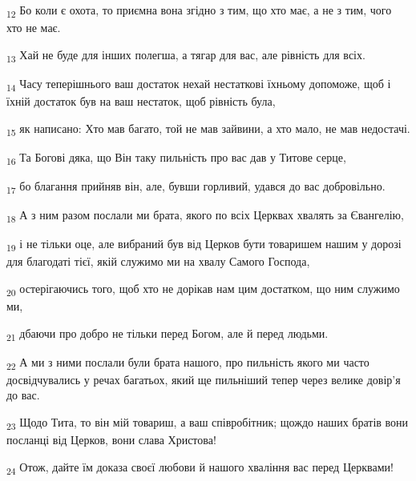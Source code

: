 \begin{tcolorbox}
\textsubscript{12} Бо коли є охота, то приємна вона згідно з тим, що хто має, а не з тим, чого хто не має.
\end{tcolorbox}
\begin{tcolorbox}
\textsubscript{13} Хай не буде для інших полегша, а тягар для вас, але рівність для всіх.
\end{tcolorbox}
\begin{tcolorbox}
\textsubscript{14} Часу теперішнього ваш достаток нехай нестаткові їхньому допоможе, щоб і їхній достаток був на ваш нестаток, щоб рівність була,
\end{tcolorbox}
\begin{tcolorbox}
\textsubscript{15} як написано: Хто мав багато, той не мав зайвини, а хто мало, не мав недостачі.
\end{tcolorbox}
\begin{tcolorbox}
\textsubscript{16} Та Богові дяка, що Він таку пильність про вас дав у Титове серце,
\end{tcolorbox}
\begin{tcolorbox}
\textsubscript{17} бо благання прийняв він, але, бувши горливий, удався до вас добровільно.
\end{tcolorbox}
\begin{tcolorbox}
\textsubscript{18} А з ним разом послали ми брата, якого по всіх Церквах хвалять за Євангелію,
\end{tcolorbox}
\begin{tcolorbox}
\textsubscript{19} і не тільки оце, але вибраний був від Церков бути товаришем нашим у дорозі для благодаті тієї, якій служимо ми на хвалу Самого Господа,
\end{tcolorbox}
\begin{tcolorbox}
\textsubscript{20} остерігаючись того, щоб хто не дорікав нам цим достатком, що ним служимо ми,
\end{tcolorbox}
\begin{tcolorbox}
\textsubscript{21} дбаючи про добро не тільки перед Богом, але й перед людьми.
\end{tcolorbox}
\begin{tcolorbox}
\textsubscript{22} А ми з ними послали були брата нашого, про пильність якого ми часто досвідчувались у речах багатьох, який ще пильніший тепер через велике довір'я до вас.
\end{tcolorbox}
\begin{tcolorbox}
\textsubscript{23} Щодо Тита, то він мій товариш, а ваш співробітник; щождо наших братів вони посланці від Церков, вони слава Христова!
\end{tcolorbox}
\begin{tcolorbox}
\textsubscript{24} Отож, дайте їм доказа своєї любови й нашого хваління вас перед Церквами!
\end{tcolorbox}
